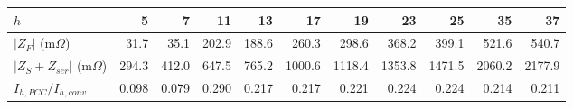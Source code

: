 \begin{tabular}{lrrrrrrrrrr}
\toprule
$h$ & 5 & 7 & 11 & 13 & 17 & 19 & 23 & 25 & 35 & 37\\
\midrule
$|Z_F|$ (m$\Omega$) & 31.7 & 35.1 & 202.9 & 188.6 & 260.3 & 298.6 & 368.2 & 399.1 & 521.6 & 540.7\\
$|Z_S+Z_{ser}|$ (m$\Omega$) & 294.3 & 412.0 & 647.5 & 765.2 & 1000.6 & 1118.4 & 1353.8 & 1471.5 & 2060.2 & 2177.9\\
$I_{h,PCC}/I_{h,conv}$ & 0.098 & 0.079 & 0.290 & 0.217 & 0.217 & 0.221 & 0.224 & 0.224 & 0.214 & 0.211\\
\bottomrule
\end{tabular}
